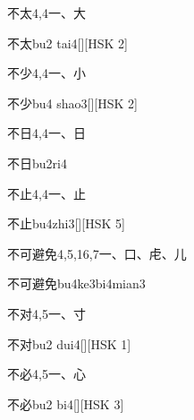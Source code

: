 \begin{entry}{不太}{4,4}{⼀、⼤}
  \begin{phonetics}{不太}{bu2 tai4}[][HSK 2]
  \end{phonetics}
\end{entry}

\begin{entry}{不少}{4,4}{⼀、⼩}
  \begin{phonetics}{不少}{bu4 shao3}[][HSK 2]
  \end{phonetics}
\end{entry}

\begin{entry}{不日}{4,4}{⼀、⽇}
  \begin{phonetics}{不日}{bu2ri4}
  \end{phonetics}
\end{entry}

\begin{entry}{不止}{4,4}{⼀、⽌}
  \begin{phonetics}{不止}{bu4zhi3}[][HSK 5]
  \end{phonetics}
\end{entry}

\begin{entry}{不可避免}{4,5,16,7}{⼀、⼝、⾌、⼉}
  \begin{phonetics}{不可避免}{bu4ke3bi4mian3}
  \end{phonetics}
\end{entry}

\begin{entry}{不对}{4,5}{⼀、⼨}
  \begin{phonetics}{不对}{bu2 dui4}[][HSK 1]
  \end{phonetics}
\end{entry}

\begin{entry}{不必}{4,5}{⼀、⼼}
  \begin{phonetics}{不必}{bu2 bi4}[][HSK 3]
  \end{phonetics}
\end{entry}

